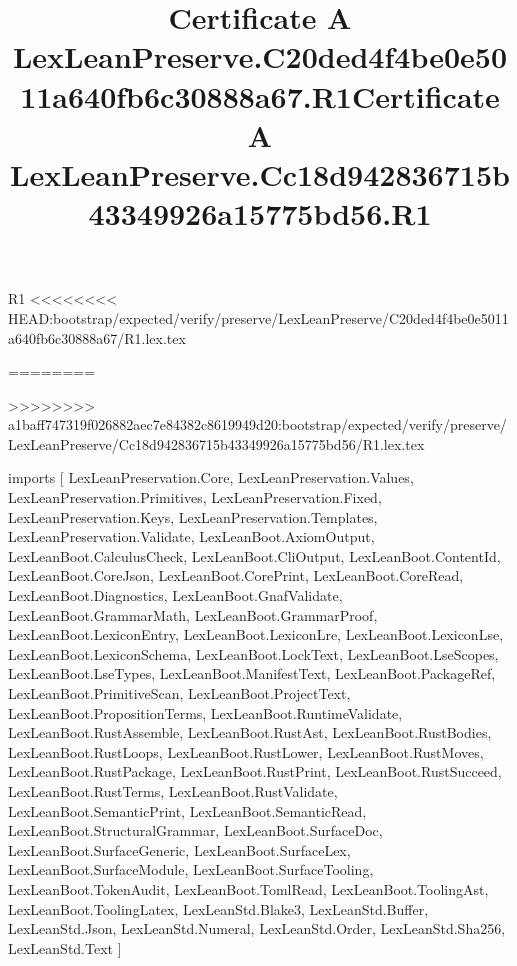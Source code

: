 \begin{lexlean}{R1}
<<<<<<<< HEAD:bootstrap/expected/verify/preserve/LexLeanPreserve/C20ded4f4be0e5011a640fb6c30888a67/R1.lex.tex
\title{Certificate A LexLeanPreserve.C20ded4f4be0e5011a640fb6c30888a67.R1}
========
\title{Certificate A LexLeanPreserve.Cc18d942836715b43349926a15775bd56.R1}
>>>>>>>> a1baff747319f026882aec7e84382c8619949d20:bootstrap/expected/verify/preserve/LexLeanPreserve/Cc18d942836715b43349926a15775bd56/R1.lex.tex
\begin{coremodule}
imports [
  LexLeanPreservation.Core,
  LexLeanPreservation.Values,
  LexLeanPreservation.Primitives,
  LexLeanPreservation.Fixed,
  LexLeanPreservation.Keys,
  LexLeanPreservation.Templates,
  LexLeanPreservation.Validate,
  LexLeanBoot.AxiomOutput,
  LexLeanBoot.CalculusCheck,
  LexLeanBoot.CliOutput,
  LexLeanBoot.ContentId,
  LexLeanBoot.CoreJson,
  LexLeanBoot.CorePrint,
  LexLeanBoot.CoreRead,
  LexLeanBoot.Diagnostics,
  LexLeanBoot.GnafValidate,
  LexLeanBoot.GrammarMath,
  LexLeanBoot.GrammarProof,
  LexLeanBoot.LexiconEntry,
  LexLeanBoot.LexiconLre,
  LexLeanBoot.LexiconLse,
  LexLeanBoot.LexiconSchema,
  LexLeanBoot.LockText,
  LexLeanBoot.LseScopes,
  LexLeanBoot.LseTypes,
  LexLeanBoot.ManifestText,
  LexLeanBoot.PackageRef,
  LexLeanBoot.PrimitiveScan,
  LexLeanBoot.ProjectText,
  LexLeanBoot.PropositionTerms,
  LexLeanBoot.RuntimeValidate,
  LexLeanBoot.RustAssemble,
  LexLeanBoot.RustAst,
  LexLeanBoot.RustBodies,
  LexLeanBoot.RustLoops,
  LexLeanBoot.RustLower,
  LexLeanBoot.RustMoves,
  LexLeanBoot.RustPackage,
  LexLeanBoot.RustPrint,
  LexLeanBoot.RustSucceed,
  LexLeanBoot.RustTerms,
  LexLeanBoot.RustValidate,
  LexLeanBoot.SemanticPrint,
  LexLeanBoot.SemanticRead,
  LexLeanBoot.StructuralGrammar,
  LexLeanBoot.SurfaceDoc,
  LexLeanBoot.SurfaceGeneric,
  LexLeanBoot.SurfaceLex,
  LexLeanBoot.SurfaceModule,
  LexLeanBoot.SurfaceTooling,
  LexLeanBoot.TokenAudit,
  LexLeanBoot.TomlRead,
  LexLeanBoot.ToolingAst,
  LexLeanBoot.ToolingLatex,
  LexLeanStd.Blake3,
  LexLeanStd.Buffer,
  LexLeanStd.Json,
  LexLeanStd.Numeral,
  LexLeanStd.Order,
  LexLeanStd.Sha256,
  LexLeanStd.Text
]


\end{coremodule}
\end{lexlean}
